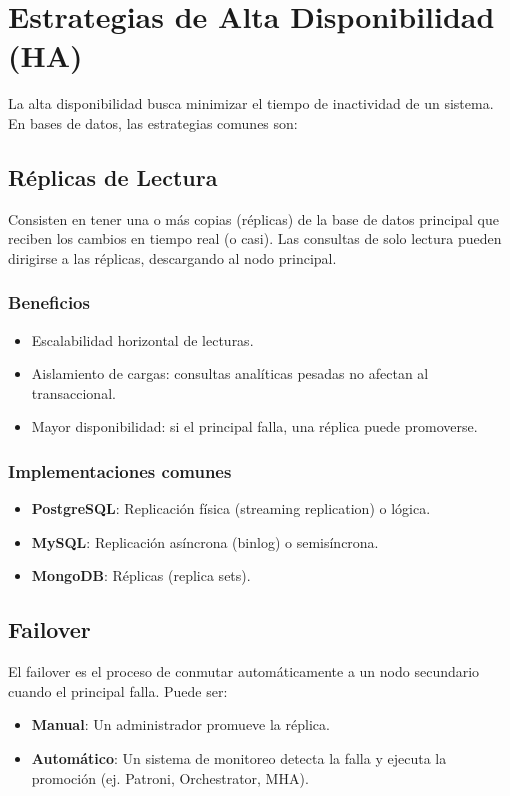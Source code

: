 \documentclass[12pt,a4paper,openany,oneside]{book}
\begin{document}
\chapter{Estrategias de Alta Disponibilidad (HA)}
La alta disponibilidad busca minimizar el tiempo de inactividad de un sistema. En bases de datos, las estrategias comunes son:

\section{Réplicas de Lectura}
Consisten en tener una o más copias (réplicas) de la base de datos principal que reciben los cambios en tiempo real (o casi). Las consultas de solo lectura pueden dirigirse a las réplicas, descargando al nodo principal.

\subsection{Beneficios}
\begin{itemize}
    \item Escalabilidad horizontal de lecturas.
    \item Aislamiento de cargas: consultas analíticas pesadas no afectan al transaccional.
    \item Mayor disponibilidad: si el principal falla, una réplica puede promoverse.
\end{itemize}

\subsection{Implementaciones comunes}
\begin{itemize}
    \item \textbf{PostgreSQL}: Replicación física (streaming replication) o lógica.
    \item \textbf{MySQL}: Replicación asíncrona (binlog) o semisíncrona.
    \item \textbf{MongoDB}: Réplicas (replica sets).
\end{itemize}

\section{Failover}
El failover es el proceso de conmutar automáticamente a un nodo secundario cuando el principal falla. Puede ser:
\begin{itemize}
    \item \textbf{Manual}: Un administrador promueve la réplica.
    \item \textbf{Automático}: Un sistema de monitoreo detecta la falla y ejecuta la promoción (ej. Patroni, Orchestrator, MHA).
\end{itemize}
\end{document}
